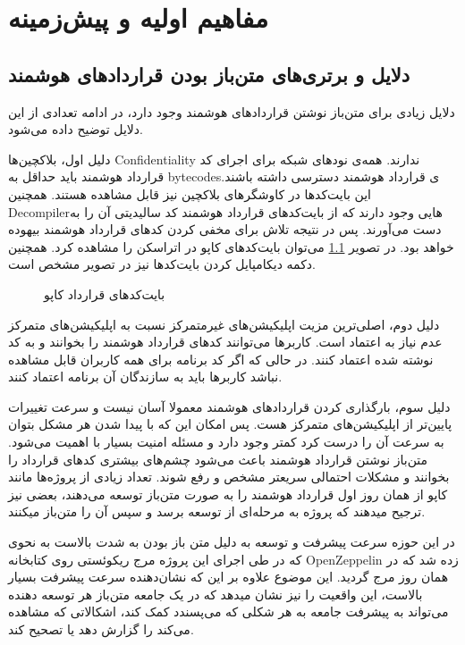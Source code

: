 \chapter{مفاهیم اولیه و پیش‌زمینه}
\section{دلایل و برتری‌های متن‌باز بودن قرارداد‌های هوشمند}
دلایل زیادی برای متن‌باز نوشتن قراردادهای هوشمند وجود دارد، در ادامه تعدادی از این دلایل توضیح داده می‌شود.

دلیل اول، بلاکچین‌ها
\gls{Confidentiality}
ندارند.
همه‌ی نود‌های شبکه برای اجرای کد قرارداد هوشمند باید حداقل به
\glspl{bytecode}ی
قرارداد هوشمند دسترسی داشته باشند. این بایت‌کد‌ها در کاوشگرهای بلاکچین نیز قابل مشاهده هستند.
همچنین
\gls{Decompiler}هایی
وجود دارند که از بایت‌کد‌های قرارداد هوشمند کد سالیدیتی آن را به دست می‌آورند.
پس در نتیجه تلاش برای مخفی کردن کدهای قرارداد هوشمند بیهوده خواهد بود.
در تصویر
\ref{fig:cappu-bytecodes}
می‌توان بایت‌کدهای کاپو در اتراسکن را مشاهده کرد.
همچنین دکمه دیکامپایل کردن بایت‌کد‌ها نیز در تصویر مشخص است.

\begin{figure}[H]
\centerline{}
\caption{بایت‌کدهای قرارداد کاپو}
\label{fig:cappu-bytecodes}
\end{figure}

دلیل دوم، اصلی‌ترین مزیت اپلیکیشن‌های غیرمتمرکز نسبت به اپلیکیشن‌های متمرکز عدم نیاز به اعتماد است.
کاربرها می‌توانند کد‌های قرارداد هوشمند را بخوانند و به کد نوشته شده اعتماد کنند.‌
در حالی که اگر کد برنامه برای همه کاربران قابل مشاهده نباشد کاربرها باید به سازندگان آن برنامه اعتماد کنند.

دلیل سوم، بارگذاری کردن قرارداد‌های هوشمند معمولا آسان نیست
و سرعت تغییرات پایین‌تر از اپلیکیشن‌های متمرکز هست.‌
پس امکان این که با پیدا شدن هر مشکل بتوان به سرعت آن را درست کرد کمتر وجود دارد
و مسئله امنیت بسیار با اهمیت می‌شود.
متن‌باز نوشتن قرارداد هوشمند باعث می‌شود چشم‌های بیشتری کدهای قرارداد را بخوانند
و مشکلات احتمالی سریعتر مشخص و رفع شوند.
تعداد زیادی از پروژه‌ها مانند کاپو از همان روز اول قرارداد هوشمند را به صورت متن‌باز توسعه می‌دهند،
بعضی نیز ترجیح میدهند که پروژه به مرحله‌ای از توسعه برسد و سپس آن را متن‌باز میکنند.

در این حوزه سرعت پیشرفت و توسعه به دلیل متن باز بودن به شدت بالاست
به نحوی که در طی اجرای این پروژه مرج ریکوئستی روی کتابخانه
\gls{OpenZeppelin}
زده شد که در همان روز مرج گردید.
این موضوع علاوه بر این که نشان‌دهنده سرعت پیشرفت بسیار بالاست،
این واقعیت را نیز نشان میدهد که در یک جامعه متن‌باز هر توسعه دهنده
می‌تواند به پیشرفت جامعه به هر شکلی که می‌پسندد کمک کند،
اشکالاتی که مشاهده می‌کند را گزارش دهد یا تصحیح کند.


